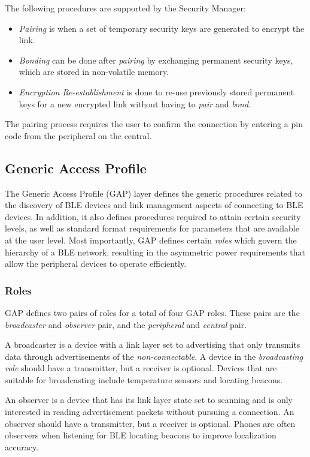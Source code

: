 The following procedures are supported by the Security Manager:
\begin{itemize}
    \item \textit{Pairing} is when a set of temporary security keys are generated to encrypt the link.
    \item \textit{Bonding} can be done after \textit{pairing} by exchanging permanent security keys, which are stored in non-volatile memory.
    \item \textit{Encryption Re-establishment} is done to re-use previously stored permanent keys for a new encrypted link without having to \textit{pair} and \textit{bond}.
\end{itemize}

The pairing process requires the user to confirm the connection by entering a pin code from the peripheral on the central.

\subsection{Generic Access Profile}
The Generic Access Profile (GAP) layer defines the generic procedures related to the discovery of BLE devices and link management aspects of connecting to BLE devices. In addition, it also defines procedures required to attain certain security levels, as well as standard format requirements for parameters that are available at the user level. Most importantly, GAP defines certain \textit{roles} which govern the hierarchy of a BLE network, resulting in the asymmetric power requirements that allow the peripheral devices to operate efficiently.

\subsubsection{Roles}
GAP defines two pairs of roles for a total of four GAP roles. These pairs are the \textit{broadcaster} and \textit{observer} pair, and the \textit{peripheral} and \textit{central} pair.

A broadcaster is a device with a link layer set to advertising that only transmits data through advertisements of the \textit{non-connectable}. A device in the \textit{broadcasting role} should have a transmitter, but a receiver is optional. Devices that are suitable for broadcasting include temperature sensors and locating beacons.

An observer is a device that has its link layer state set to scanning and is only interested in reading advertisement packets without pursuing a connection. An observer should have a transmitter, but a receiver is optional. Phones are often observers when listening for BLE locating beacons to improve localization accuracy. 

